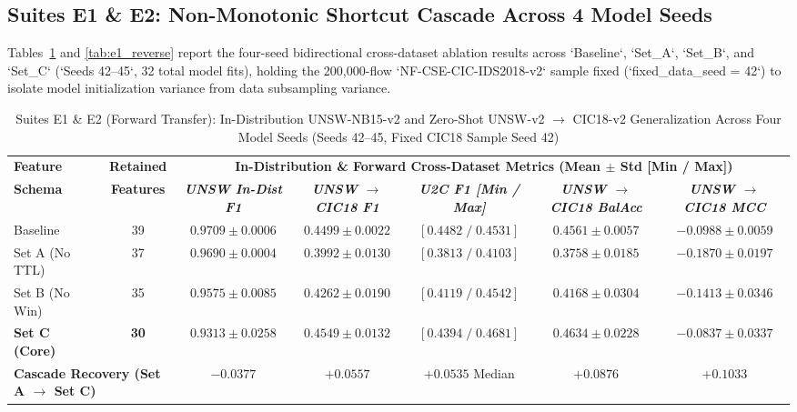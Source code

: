 ﻿\documentclass[conference]{IEEEtran}
\begin{document}
\subsection{Suites E1 \& E2: Non-Monotonic Shortcut Cascade Across 4 Model Seeds}
Tables~\ref{tab:e1_forward} and \ref{tab:e1_reverse} report the four-seed bidirectional cross-dataset ablation results across `Baseline`, `Set_A`, `Set_B`, and `Set_C` (`Seeds 42--45`, 32 total model fits), holding the 200,000-flow `NF-CSE-CIC-IDS2018-v2` sample fixed (`fixed_data_seed = 42`) to isolate model initialization variance from data subsampling variance.

\begin{table}[t]
\caption{Suites E1 \& E2 (Forward Transfer): In-Distribution UNSW-NB15-v2 and Zero-Shot UNSW-v2 $\to$ CIC18-v2 Generalization Across Four Model Seeds (Seeds 42--45, Fixed CIC18 Sample Seed 42)}
\begin{center}
\begin{tabular}{|l|c|c|c|c|c|c|}
\hline
\textbf{Feature} & \textbf{Retained} & \multicolumn{5}{|c|}{\textbf{In-Distribution \& Forward Cross-Dataset Metrics (Mean $\pm$ Std [Min / Max])}} \\
\cline{3-7}
\textbf{Schema} & \textbf{Features} & \textbf{\textit{UNSW In-Dist F1}} & \textbf{\textit{UNSW $\to$ CIC18 F1}} & \textbf{\textit{U2C F1 [Min / Max]}} & \textbf{\textit{UNSW $\to$ CIC18 BalAcc}} & \textbf{\textit{UNSW $\to$ CIC18 MCC}} \\
\hline
Baseline & 39 & $0.9709 \pm 0.0006$ & $0.4499 \pm 0.0022$ & $[0.4482 \;/\; 0.4531]$ & $0.4561 \pm 0.0057$ & $-0.0988 \pm 0.0059$ \\
Set A (No TTL) & 37 & $0.9690 \pm 0.0004$ & $0.3992 \pm 0.0130$ & $[0.3813 \;/\; 0.4103]$ & $0.3758 \pm 0.0185$ & $-0.1870 \pm 0.0197$ \\
Set B (No Win) & 35 & $0.9575 \pm 0.0085$ & $0.4262 \pm 0.0190$ & $[0.4119 \;/\; 0.4542]$ & $0.4168 \pm 0.0304$ & $-0.1413 \pm 0.0346$ \\
\textbf{Set C (Core)} & \textbf{30} & $\mathbf{0.9313 \pm 0.0258}$ & $\mathbf{0.4549 \pm 0.0132}$ & $\mathbf{[0.4394 \;/\; 0.4681]}$ & $\mathbf{0.4634 \pm 0.0228}$ & $\mathbf{-0.0837 \pm 0.0337}$ \\
\hline
\multicolumn{2}{|l|}{\textbf{Cascade Recovery (Set A $\to$ Set C)}} & $-0.0377$ & $+0.0557$ & $+0.0535$ Median & $+0.0876$ & $+0.1033$ \\
\hline
\end{tabular}
\label{tab:e1_forward}
\end{center}
\end{table}
\end{document}
